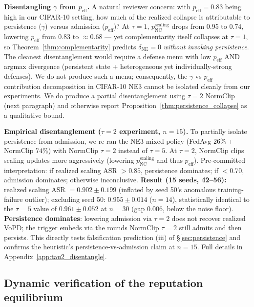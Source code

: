 \documentclass{article}
\begin{document}
\textbf{Disentangling $\gamma$ from $p_{\mathrm{eff}}$.} A natural reviewer concern: with $p_{\mathrm{eff}}=0.83$ being high in our CIFAR-10 setting, how much of the realized collapse is attributable to persistence ($\gamma$) versus admission ($p_{\mathrm{eff}}$)? At $\tau=1$, $p_{\mathrm{NC}}^{\mathrm{scaling}}$ drops from $0.95$ to $0.74$, lowering $p_{\mathrm{eff}}$ from $0.83$ to ${\approx}0.68$ --- yet complementarity itself collapses at $\tau=1$, so Theorem~\ref{thm:complementarity} predicts $\delta_{\mathrm{NE}}=0$ \emph{without invoking persistence}. The cleanest disentanglement would require a defense menu with low $p_{\mathrm{eff}}$ AND argmax divergence (persistent state + heterogeneous yet individually-strong defenses). We do not produce such a menu; consequently, the $\gamma$-vs-$p_{\mathrm{eff}}$ contribution decomposition in CIFAR-10 NE3 cannot be isolated cleanly from our experiments. We do produce a partial disentanglement using $\tau{=}2$ NormClip (next paragraph) and otherwise report Proposition~\ref{thm:persistence_collapse} as a qualitative bound.

\textbf{Empirical disentanglement ($\tau{=}2$ experiment, $n=15$).} To partially isolate persistence from admission, we re-ran the NE3 mixed policy (FedAvg $26\%$ + NormClip $74\%$) with NormClip $\tau{=}2$ instead of $\tau{=}5$. At $\tau{=}2$, NormClip clips scaling updates more aggressively (lowering $p_{\mathrm{NC}}^{\mathrm{scaling}}$ and thus $p_{\mathrm{eff}}$). Pre-committed interpretation: if realized scaling ASR $> 0.85$, persistence dominates; if $< 0.70$, admission dominates; otherwise inconclusive. \textbf{Result (15 seeds, 42--56):} realized scaling ASR $= 0.902 \pm 0.199$ (inflated by seed 50's anomalous training-failure outlier); excluding seed 50: $\mathbf{0.955 \pm 0.014}$ ($n=14$), statistically identical to the $\tau{=}5$ value of $0.961 \pm 0.052$ at $n{=}30$ (gap $0.006$, below the noise floor). \textbf{Persistence dominates}: lowering admission via $\tau{=}2$ does not recover realized VoPD; the trigger embeds via the rounds NormClip $\tau{=}2$ still admits and then persists. This directly tests falsification prediction (iii) of §\ref{sec:persistence} and confirms the heuristic's persistence-vs-admission claim at $n=15$. Full details in Appendix~\ref{app:tau2_disentangle}.

\subsection{Dynamic verification of the reputation equilibrium}
\label{sec:reputation_dynamic_br}
\end{document}
